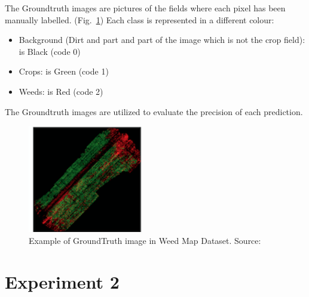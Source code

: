 The Groundtruth images are pictures of the fields where each pixel has been manually labelled. (Fig.~\ref{fig:figure-4.1.4})
Each class is represented in a different colour:
\begin{itemize}[itemsep=0.1cm]
	\item Background (Dirt and part and part of the image which is not the crop field): is Black (code 0)
	\item Crops: is Green (code 1)
	\item Weeds: is Red (code 2)
\end{itemize}
The Groundtruth images are utilized to evaluate the precision of each prediction.
\begin{figure}[t]
	\centering
	\includegraphics[width=5cm]{figures/figure-4.1.4.png}
	\caption[Example of GroundTruth in Weed Map Dataset]{Example of GroundTruth image in Weed Map Dataset. Source:~\cite{Tesi-2.1}}
	\label{fig:figure-4.1.4}
\end{figure}




\section{Experiment 2}

\lipsum  %
